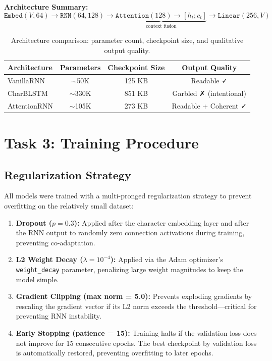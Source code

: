 \documentclass[11pt,a4paper]{article}
\begin{document}
\textbf{Architecture Summary:}
\[
\texttt{Embed}(V,64) \to \texttt{RNN}(64, 128) \to \underbrace{\texttt{Attention}(128) \to [h_t; c_t]}_{\text{context fusion}} \to \texttt{Linear}(256, V)
\]

\begin{table}[H]
    \centering
    \renewcommand{\arraystretch}{1.3}
    \begin{tabular}{@{} l c c c @{}}
        \toprule
        \textbf{\color{iitjblue} Architecture} & \textbf{\color{iitjblue} Parameters} & \textbf{\color{iitjblue} Checkpoint Size} & \textbf{\color{iitjblue} Output Quality} \\
        \midrule
        VanillaRNN & $\sim$50K & 125 KB & Readable ✓ \\
        \rowcolor{highlightbg}
        CharBLSTM  & $\sim$330K & 851 KB & Garbled ✗ (intentional) \\
        AttentionRNN & $\sim$105K & 273 KB & Readable + Coherent ✓ \\
        \bottomrule
    \end{tabular}
    \vspace{0.5em}
    \caption{Architecture comparison: parameter count, checkpoint size, and qualitative output quality.}
\end{table}

\section{Task 3: Training Procedure}

\subsection{Regularization Strategy}
All models were trained with a multi-pronged regularization strategy to prevent overfitting on the relatively small dataset:

\begin{enumerate}[label=\textbf{\textcolor{iitjblue}{\arabic*.}}, itemsep=0.5em]
    \justifying
    \item \textbf{Dropout ($p=0.3$):} Applied after the character embedding layer and after the RNN output to randomly zero connection activations during training, preventing co-adaptation.
    \item \textbf{L2 Weight Decay ($\lambda = 10^{-4}$):} Applied via the Adam optimizer's \texttt{weight\_decay} parameter, penalizing large weight magnitudes to keep the model simple.
    \item \textbf{Gradient Clipping (max norm = 5.0):} Prevents exploding gradients by rescaling the gradient vector if its L2 norm exceeds the threshold—critical for preventing RNN instability.
    \item \textbf{Early Stopping (patience = 15):} Training halts if the validation loss does not improve for 15 consecutive epochs. The best checkpoint by validation loss is automatically restored, preventing overfitting to later epochs.
\end{enumerate}
\end{document}
